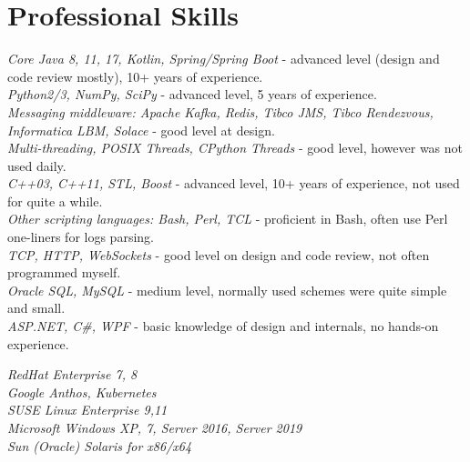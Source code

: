 \documentclass[10pt]{article} %
\begin{document}

\section{Professional Skills}

{
\textit{Core Java 8, 11, 17, Kotlin, Spring/Spring Boot} - advanced level (design and code review mostly), 10+ years of experience.\\
\textit{Python2/3, NumPy, SciPy} - advanced level, 5 years of experience.\\
\textit{Messaging middleware: Apache Kafka, Redis, Tibco JMS, Tibco Rendezvous, Informatica LBM, Solace} - good level at design.\\
\textit{Multi-threading, POSIX Threads, CPython Threads} - good level, however was not used daily.\\
\textit{C++03, C++11, STL, Boost} - advanced level, 10+ years of experience, not used for quite a while.\\
\textit{Other scripting languages: Bash, Perl, TCL} -  proficient in Bash, often use Perl one-liners for logs parsing.\\
\textit{TCP, HTTP, WebSockets} - good level on design and code review, not often programmed myself.\\
\textit{Oracle SQL, MySQL} - medium level, normally used schemes were quite simple and small.\\
\textit{ASP.NET, C\#, WPF} - basic knowledge of design and internals, no hands-on experience.
}


{
\textit{RedHat Enterprise 7, 8}\\
\textit{Google Anthos, Kubernetes}\\
\textit{SUSE Linux Enterprise 9,11}\\
\textit{Microsoft Windows XP, 7, Server 2016, Server 2019}\\
\textit{Sun (Oracle) Solaris for x86/x64}
}

\end{document}
